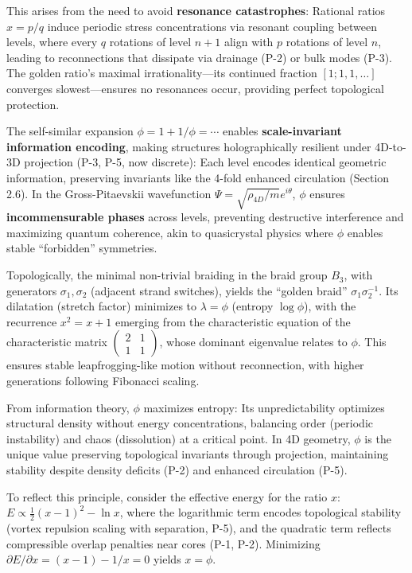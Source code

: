 This arises from the need to avoid \textbf{resonance catastrophes}: Rational ratios $x = p/q$ induce periodic stress concentrations via resonant coupling between levels, where every $q$ rotations of level $n+1$ align with $p$ rotations of level $n$, leading to reconnections that dissipate via drainage (P-2) or bulk modes (P-3). The golden ratio's maximal irrationality---its continued fraction $[1; 1, 1, \ldots]$ converges slowest---ensures no resonances occur, providing perfect topological protection.

The self-similar expansion $\phi = 1 + 1/\phi = \cdots$ enables \textbf{scale-invariant information encoding}, making structures holographically resilient under 4D-to-3D projection (P-3, P-5, now discrete): Each level encodes identical geometric information, preserving invariants like the 4-fold enhanced circulation (Section 2.6). In the Gross-Pitaevskii wavefunction $\Psi = \sqrt{\rho_{4D}/m} e^{i \theta}$, $\phi$ ensures \textbf{incommensurable phases} across levels, preventing destructive interference and maximizing quantum coherence, akin to quasicrystal physics where $\phi$ enables stable ``forbidden'' symmetries.

Topologically, the minimal non-trivial braiding in the braid group $B_3$, with generators $\sigma_1, \sigma_2$ (adjacent strand switches), yields the ``golden braid'' $\sigma_1 \sigma_2^{-1}$. Its dilatation (stretch factor) minimizes to $\lambda = \phi$ (entropy $\log \phi$), with the recurrence $x^2 = x + 1$ emerging from the characteristic equation of the characteristic matrix $\begin{pmatrix} 2 & 1 \\ 1 & 1 \end{pmatrix}$, whose dominant eigenvalue relates to $\phi$. This ensures stable leapfrogging-like motion without reconnection, with higher generations following Fibonacci scaling.

From information theory, $\phi$ maximizes entropy: Its unpredictability optimizes structural density without energy concentrations, balancing order (periodic instability) and chaos (dissolution) at a critical point. In 4D geometry, $\phi$ is the unique value preserving topological invariants through projection, maintaining stability despite density deficits (P-2) and enhanced circulation (P-5).

To reflect this principle, consider the effective energy for the ratio $x$: $E \propto \frac{1}{2} (x - 1)^2 - \ln x$, where the logarithmic term encodes topological stability (vortex repulsion scaling with separation, P-5), and the quadratic term reflects compressible overlap penalties near cores (P-1, P-2). Minimizing $\partial E / \partial x = (x - 1) - 1/x = 0$ yields $x = \phi$.

